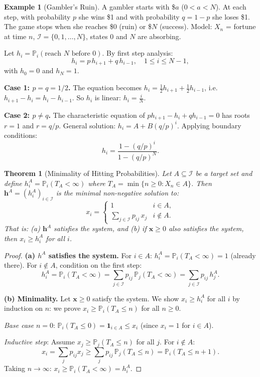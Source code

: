 \documentclass[12pt, a4paper]{article}
\theoremstyle{definition}
\newtheorem{example}{Example}[section]
\theoremstyle{plain}
\newtheorem{theorem}{Theorem}[section]
\newcommand{\PP}{\mathbb{P}}
\newcommand{\II}{\mathcal{I}}
\begin{document}
\begin{example}[Gambler's Ruin]
A gambler starts with \$\(a\) ($0 < a < N$). At each step, with probability $p$ she wins \$1 and with probability $q = 1-p$ she loses \$1. The game stops when she reaches \$0 (ruin) or \$\(N\) (success). Model: $X_n$ = fortune at time $n$, $\II = \{0, 1, \ldots, N\}$, states 0 and $N$ are absorbing.

Let $h_i = \PP_i(\text{reach } N \text{ before } 0)$. By first step analysis:
\begin{equation*}
  h_i = p\, h_{i+1} + q\, h_{i-1}, \quad 1 \le i \le N-1,
\end{equation*}
with $h_0 = 0$ and $h_N = 1$.

\textbf{Case 1: $p = q = 1/2$.} The equation becomes $h_i = \frac{1}{2}h_{i+1} + \frac{1}{2}h_{i-1}$, i.e.\ $h_{i+1} - h_i = h_i - h_{i-1}$. So $h_i$ is linear: $h_i = \frac{i}{N}$.

\textbf{Case 2: $p \neq q$.} The characteristic equation of $ph_{i+1} - h_i + qh_{i-1} = 0$ has roots $r = 1$ and $r = q/p$. General solution: $h_i = A + B(q/p)^i$. Applying boundary conditions:
\begin{equation*}
  h_i = \frac{1 - (q/p)^i}{1 - (q/p)^N}.
\end{equation*}
\end{example}

\begin{theorem}[Minimality of Hitting Probabilities]
\label{thm:minimality}
Let $A \subseteq \II$ be a target set and define $h^A_i = \PP_i(T_A < \infty)$ where $T_A = \min\{n \ge 0 : X_n \in A\}$. Then $\mathbf{h}^A = (h^A_i)_{i \in \II}$ is the \emph{minimal non-negative solution} to:
\[
  x_i = \begin{cases} 1 & i \in A, \\ \displaystyle\sum_{j \in \II} p_{ij}\, x_j & i \notin A. \end{cases}
\]
That is: (a) $\mathbf{h}^A$ satisfies the system, and (b) if $\mathbf{x} \ge 0$ also satisfies the system, then $x_i \ge h^A_i$ for all $i$.
\end{theorem}

\begin{proof}
\textbf{(a) $h^A$ satisfies the system.} For $i \in A$: $h^A_i = \PP_i(T_A < \infty) = 1$ (already there). For $i \notin A$, condition on the first step:
\[
  h^A_i = \PP_i(T_A < \infty) = \sum_{j \in \II} p_{ij}\, \PP_j(T_A < \infty) = \sum_{j \in \II} p_{ij}\, h^A_j.
\]

\textbf{(b) Minimality.} Let $\mathbf{x} \ge 0$ satisfy the system. We show $x_i \ge h^A_i$ for all $i$ by induction on $n$: we prove $x_i \ge \PP_i(T_A \le n)$ for all $n \ge 0$.

\emph{Base case} $n=0$: $\PP_i(T_A \le 0) = \mathbf{1}_{i \in A} \le x_i$ (since $x_i = 1$ for $i \in A$).

\emph{Inductive step}: Assume $x_j \ge \PP_j(T_A \le n)$ for all $j$. For $i \notin A$:
\[
  x_i = \sum_{j} p_{ij} x_j \ge \sum_j p_{ij}\, \PP_j(T_A \le n) = \PP_i(T_A \le n+1).
\]
Taking $n \to \infty$: $x_i \ge \PP_i(T_A < \infty) = h^A_i$.
\end{proof}
\end{document}

